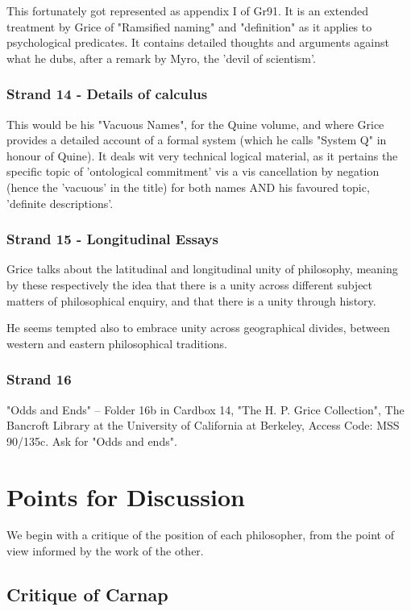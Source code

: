\documentclass[10pt,titlepage]{book}
\begin{document}
This fortunately got represented as appendix I of Gr91\cite{grice91}.
It is an extended treatment by Grice of "Ramsified naming" and "definition" as it applies to psychological predicates.
It contains detailed thoughts and arguments against what he dubs, after a remark by Myro, the 'devil of scientism'. 
 
\subsection{Strand 14 - Details of calculus}

This would be his "Vacuous Names", for the Quine volume, and where Grice provides a detailed account of a formal system (which he calls "System Q" in honour of Quine).
It deals wit very technical logical material, as it pertains the specific topic of 'ontological commitment' vis a vis cancellation by negation (hence the 'vacuous' in the title) for both names AND his favoured topic, 'definite descriptions'.
 

\subsection{Strand 15 - Longitudinal Essays}

Grice talks about the latitudinal and longitudinal unity of philosophy, meaning by these respectively the idea that there is a unity across different subject matters of philosophical enquiry, and that there is a unity through history.

He seems tempted also to embrace unity across geographical divides, between western and eastern philosophical traditions.

\subsection{Strand 16}

"Odds and Ends" -- Folder 16b in Cardbox 14, "The H. P. Grice
Collection", The Bancroft Library at the University of California at
Berkeley, Access Code: MSS 90/135c. Ask for "Odds and ends".


\chapter{Points for Discussion}

We begin with a critique of the position of each philosopher, from the point of view informed by the work of the other.

\section{Critique of Carnap}
\end{document}

